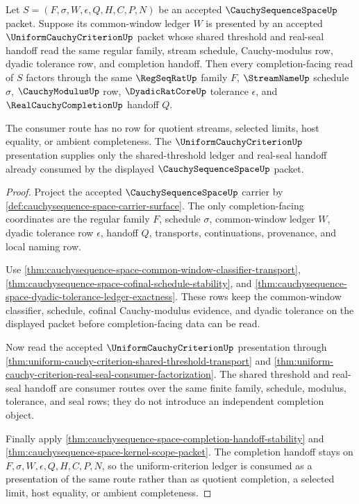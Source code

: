 \begin{theorem}
\label{thm:cauchysequence-space-uniformcriterion-consumption}
Let $S=(F,\sigma,W,\epsilon,Q,H,C,P,N)$ be an accepted $\CauchySequenceSpaceUp$ packet. Suppose its common-window ledger $W$ is presented by an accepted $\UniformCauchyCriterionUp$ packet whose shared threshold and real-seal handoff read the same regular family, stream schedule, Cauchy-modulus row, dyadic tolerance row, and completion handoff. Then every completion-facing read of $S$ factors through the same $\RegSeqRatUp$ family $F$, $\StreamNameUp$ schedule $\sigma$, $\CauchyModulusUp$ row, $\DyadicRatCoreUp$ tolerance $\epsilon$, and $\RealCauchyCompletionUp$ handoff $Q$.

The consumer route has no row for quotient streams, selected limits, host equality, or ambient completeness. The $\UniformCauchyCriterionUp$ presentation supplies only the shared-threshold ledger and real-seal handoff already consumed by the displayed $\CauchySequenceSpaceUp$ packet.
\end{theorem}
\begin{proof}
Project the accepted $\CauchySequenceSpaceUp$ carrier by \autoref{def:cauchysequence-space-carrier-surface}. The only completion-facing coordinates are the regular family $F$, schedule $\sigma$, common-window ledger $W$, dyadic tolerance row $\epsilon$, handoff $Q$, transports, continuations, provenance, and local naming row.

Use \autoref{thm:cauchysequence-space-common-window-classifier-transport}, \autoref{thm:cauchysequence-space-cofinal-schedule-stability}, and \autoref{thm:cauchysequence-space-dyadic-tolerance-ledger-exactness}. These rows keep the common-window classifier, schedule, cofinal Cauchy-modulus evidence, and dyadic tolerance on the displayed packet before completion-facing data can be read.

Now read the accepted $\UniformCauchyCriterionUp$ presentation through \autoref{thm:uniform-cauchy-criterion-shared-threshold-transport} and \autoref{thm:uniform-cauchy-criterion-real-seal-consumer-factorization}. The shared threshold and real-seal handoff are consumer routes over the same finite family, schedule, modulus, tolerance, and seal rows; they do not introduce an independent completion object.

Finally apply \autoref{thm:cauchysequence-space-completion-handoff-stability} and \autoref{thm:cauchysequence-space-kernel-scope-packet}. The completion handoff stays on $F,\sigma,W,\epsilon,Q,H,C,P,N$, so the uniform-criterion ledger is consumed as a presentation of the same route rather than as quotient completion, a selected limit, host equality, or ambient completeness.
\end{proof}

